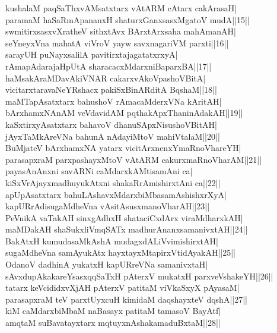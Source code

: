 \documentclass{article}
\begin{document}
kushalaM paqSaThxvAMsatxtarx vAtARM cAtarx cakArasaH|\\
paramaM haSaRmApananxH shaturxGanxsasxMgatoV mudA||15||\\
swmitirxsasxvXratheV sithxtAvx BArxtArxsaha mahAmanAH|\\
seYneyxVna mahatA viVroV yayw savxnagariVM parxti||16||\\
sarayUH puNayxsalilA pavitirxtajagatatxrxyA|\\
rAmapAdarajaHpUtA sharacacxMdarxniBaparxBA||17||\\
haMsakAraMDavAkiVNAR cakarxvAkoVpashoVBitA|\\
vicitarxtaravaNeYRshacx pakiSxBinARditA BqshaM||18||\\
maMTapAsatxtarx bahushoV rAmacaMderxVNa kAritAH|\\
bArxhamxNAnAM veVdavidAM pqthakApxThaninAdakAH||19||\\
kaSxtirxyAsatxtarx bahavoV dhanuSApxNisushoVBitAH|\\
jAyxTaMkAreVNa bahunA nAdayiMtoV mahiVtalaM||20||\\
BuMjateV bArxhamxNA yatarx vicitArxnenxYmaRnoVhareYH|\\
parasapxraM parxpashayxMtoV vAtARM cakurxmaRnoVharAM||21||\\
payasAnAnxni savARNi caMdarxkAMtisamAni ca|\\
kiSxVrAjayxmadhuyukAtxni shakaRrAmishirxtAni ca||22||\\
apUpAsatxtarx bahuLAshavxMdarxbiMbasamAshishxrXyA|\\
kapURrAdisugaMdheVna vAsitAsusxmanoVharAH||23||\\
PeVnikA vaTakAH sinxgAdhxH shataciCxdArx viraMdharxkAH|\\
maMDakAH shaSukxliVmqSATx madhurAnanxsamanivxtAH||24||\\
BakAtxH kumudasaMkAshA mudagxdALiVvimishirxtAH|\\
sugaMdheVna samAyukAtx hayxtayxMtapirxVtidAyakAH||25||\\
OdanoV dadhinA yukatxH kapURreVNa samanivxtaH|\\
sAvxdupAkakareYsasxqqSaTxH pAterxV mukatxH parxveVshakeYH||26||\\
tatarx keVcididxvXjAH pAterxV patitaM viVkaSxyX pAyasaM|\\
parasapxraM teV parxtUyxcuH kimidaM daqshayxteV dqshA||27||\\
kiM caMdarxbiMbaM naBasayx patitaM tamasoV BayAtf|\\
amqtaM suBavatayxtarx mqtuyxnAshakamaduBxtaM||28||\\
\end{document}

